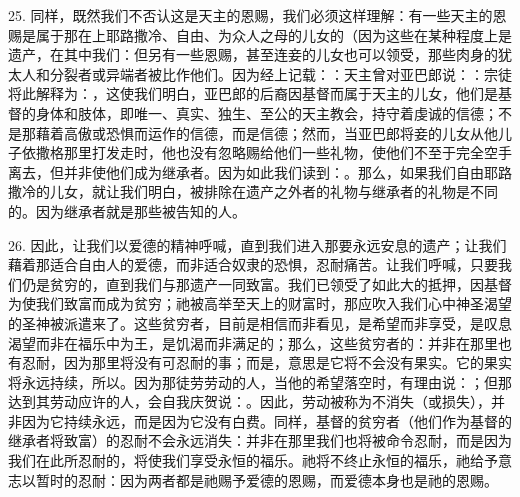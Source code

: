 25. 同样，既然我们不否认这是天主的恩赐，我们必须这样理解：有一些天主的恩赐是属于那在上耶路撒冷、自由、为众人之母的儿女的（因为这些在某种程度上是遗产，在其中我们：但另有一些恩赐，甚至连妾的儿女也可以领受，那些肉身的犹太人和分裂者或异端者被比作他们。因为经上记载：：天主曾对亚巴郎说：：宗徒将此解释为：，这使我们明白，亚巴郎的后裔因基督而属于天主的儿女，他们是基督的身体和肢体，即唯一、真实、独生、至公的天主教会，持守着虔诚的信德；不是那藉着高傲或恐惧而运作的信德，而是信德；然而，当亚巴郎将妾的儿女从他儿子依撒格那里打发走时，他也没有忽略赐给他们一些礼物，使他们不至于完全空手离去，但并非使他们成为继承者。因为如此我们读到：。那么，如果我们自由耶路撒冷的儿女，就让我们明白，被排除在遗产之外者的礼物与继承者的礼物是不同的。因为继承者就是那些被告知的人。\par

26. 因此，让我们以爱德的精神呼喊，直到我们进入那要永远安息的遗产；让我们藉着那适合自由人的爱德，而非适合奴隶的恐惧，忍耐痛苦。让我们呼喊，只要我们仍是贫穷的，直到我们与那遗产一同致富。我们已领受了如此大的抵押，因基督为使我们致富而成为贫穷；祂被高举至天上的财富时，那应吹入我们心中神圣渴望的圣神被派遣来了。这些贫穷者，目前是相信而非看见，是希望而非享受，是叹息渴望而非在福乐中为王，是饥渴而非满足的；那么，这些贫穷者的：并非在那里也有忍耐，因为那里将没有可忍耐的事；而是，意思是它将不会没有果实。它的果实将永远持续，所以。因为那徒劳劳动的人，当他的希望落空时，有理由说：；但那达到其劳动应许的人，会自我庆贺说：。因此，劳动被称为不消失（或损失），并非因为它持续永远，而是因为它没有白费。同样，基督的贫穷者（他们作为基督的继承者将致富）的忍耐不会永远消失：并非在那里我们也将被命令忍耐，而是因为我们在此所忍耐的，将使我们享受永恒的福乐。祂将不终止永恒的福乐，祂给予意志以暂时的忍耐：因为两者都是祂赐予爱德的恩赐，而爱德本身也是祂的恩赐。\par

